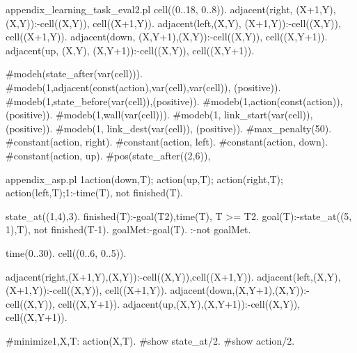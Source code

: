 \begin{filecontents*}{appendix_learning_task_eval2.pl}
cell((0..18, 0..8)).
adjacent(right, (X+1,Y),(X,Y)):-cell((X,Y)), cell((X+1,Y)).
adjacent(left,(X,Y),  (X+1,Y)):-cell((X,Y)), cell((X+1,Y)).
adjacent(down, (X,Y+1),(X,Y)):-cell((X,Y)), cell((X,Y+1)).
adjacent(up,   (X,Y),  (X,Y+1)):-cell((X,Y)), cell((X,Y+1)).

#modeh(state_after(var(cell))).
#modeb(1,adjacent(const(action),var(cell),var(cell)),
      (positive)).
#modeb(1,state_before(var(cell)),(positive)).
#modeb(1,action(const(action)),(positive)).
#modeb(1,wall(var(cell))).
#modeb(1, link_start(var(cell)), (positive)).
#modeb(1, link_dest(var(cell)), (positive)).
#max_penalty(50).
#constant(action, right).
#constant(action, left).
#constant(action, down).
#constant(action, up).
#pos({state_after((2,6))}, 
\end{filecontents*}

\begin{filecontents*}{appendix_asp.pl}
1{action(down,T);
  action(up,T);
  action(right,T);
  action(left,T);}1:-time(T), not finished(T).

state_at((1,4),3).
finished(T):-goal(T2),time(T), T >= T2.
goal(T):-state_at((5, 1),T), not finished(T-1).
goalMet:-goal(T).
:-not goalMet.

time(0..30).
cell((0..6, 0..5)).

adjacent(right,(X+1,Y),(X,Y)):-cell((X,Y)),cell((X+1,Y)).
adjacent(left,(X,Y),(X+1,Y)):-cell((X,Y)), cell((X+1,Y)).
adjacent(down,(X,Y+1),(X,Y)):-cell((X,Y)), cell((X,Y+1)).
adjacent(up,(X,Y),(X,Y+1)):-cell((X,Y)), cell((X,Y+1)).

#minimize{1,X,T: action(X,T)}.
#show state_at/2.
#show action/2.
\end{filecontents*}